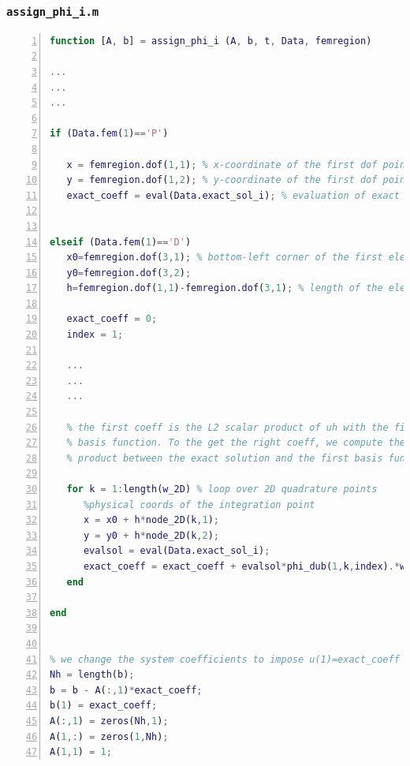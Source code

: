 \documentclass[a4paper,11pt]{article}
\begin{document}
\subsubsection{\texttt{assign\_phi\_i.m}}\label{assign}
\begin{lstlisting}[language=Matlab,basicstyle=\small, numbers=left, numberstyle=\tiny,  name = assign_phi_i.m, frame=single]
function [A, b] = assign_phi_i (A, b, t, Data, femregion)

...
...
...

if (Data.fem(1)=='P')

   x = femregion.dof(1,1); % x-coordinate of the first dof point
   y = femregion.dof(1,2); % y-coordinate of the first dof point
   exact_coeff = eval(Data.exact_sol_i); % evaluation of exact sol


elseif (Data.fem(1)=='D')
   x0=femregion.dof(3,1); % bottom-left corner of the first element
   y0=femregion.dof(3,2);
   h=femregion.dof(1,1)-femregion.dof(3,1); % length of the element

   exact_coeff = 0;
   index = 1;
   
   ...
   ...
   ...

   % the first coeff is the L2 scalar product of uh with the first
   % basis function. To the get the right coeff, we compute the scalar 
   % product between the exact solution and the first basis function
   
   for k = 1:length(w_2D) % loop over 2D quadrature points
      %physical coords of the integration point
      x = x0 + h*node_2D(k,1);  
      y = y0 + h*node_2D(k,2);
      evalsol = eval(Data.exact_sol_i);
      exact_coeff = exact_coeff + evalsol*phi_dub(1,k,index).*w_2D(k);
   end

end


% we change the system coefficients to impose u(1)=exact_coeff
Nh = length(b);
b = b - A(:,1)*exact_coeff;
b(1) = exact_coeff;  
A(:,1) = zeros(Nh,1);
A(1,:) = zeros(1,Nh);
A(1,1) = 1;
\end{lstlisting}
\end{document}

